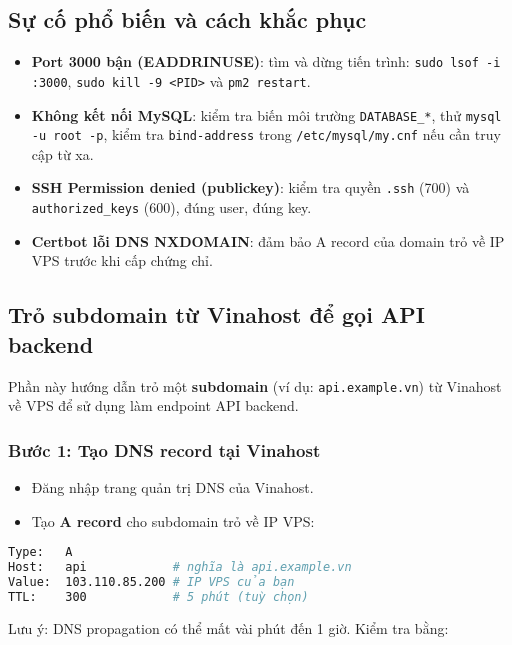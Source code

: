 \documentclass[12pt,a4paper]{article}
\begin{document}
\subsection{Sự cố phổ biến và cách khắc phục}

\begin{itemize}
  \item \textbf{Port 3000 bận (EADDRINUSE)}: tìm và dừng tiến trình: \texttt{sudo lsof -i :3000}, \texttt{sudo kill -9 <PID>} và \texttt{pm2 restart}.
  \item \textbf{Không kết nối MySQL}: kiểm tra biến môi trường \texttt{DATABASE\_*}, thử \texttt{mysql -u root -p}, kiểm tra \texttt{bind-address} trong \texttt{/etc/mysql/my.cnf} nếu cần truy cập từ xa.
  \item \textbf{SSH Permission denied (publickey)}: kiểm tra quyền \texttt{.ssh} (700) và \texttt{authorized\_keys} (600), đúng user, đúng key.
  \item \textbf{Certbot lỗi DNS NXDOMAIN}: đảm bảo A record của domain trỏ về IP VPS trước khi cấp chứng chỉ.
\end{itemize}

\subsection{Trỏ subdomain từ Vinahost để gọi API backend}

Phần này hướng dẫn trỏ một \textbf{subdomain} (ví dụ: \texttt{api.example.vn}) từ Vinahost về VPS để sử dụng làm endpoint API backend.

\subsubsection{Bước 1: Tạo DNS record tại Vinahost}

\begin{itemize}
  \item Đăng nhập trang quản trị DNS của Vinahost.
  \item Tạo \textbf{A record} cho subdomain trỏ về IP VPS:
\end{itemize}

\begin{lstlisting}[caption=Tham chiếu cấu hình DNS (Vinahost), language=bash]
Type:   A
Host:   api            # nghĩa là api.example.vn
Value:  103.110.85.200 # IP VPS của bạn
TTL:    300            # 5 phút (tuỳ chọn)
\end{lstlisting}

Lưu ý: DNS propagation có thể mất vài phút đến 1 giờ. Kiểm tra bằng:
\end{document}
